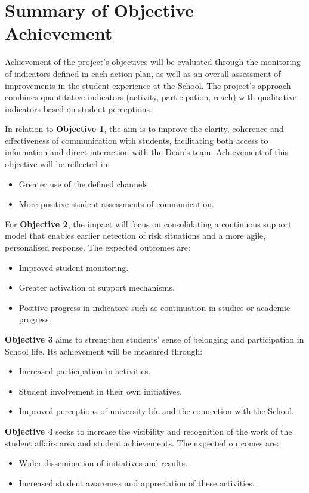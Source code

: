 \documentclass[11pt,a4paper]{scrreprt}
\begin{document}
\section{Summary of Objective Achievement}

\small
Achievement of the project's objectives will be evaluated through the monitoring of indicators defined in each action plan, as well as an overall assessment of improvements in the student experience at the School. The project's approach combines quantitative indicators (activity, participation, reach) with qualitative indicators based on student perceptions.

In relation to \textbf{Objective 1}, the aim is to improve the clarity, coherence and effectiveness of communication with students, facilitating both access to information and direct interaction with the Dean's team. Achievement of this objective will be reflected in:
\begin{itemize}[noitemsep,topsep=2pt]
\item Greater use of the defined channels.
\item More positive student assessments of communication.
\end{itemize}

For \textbf{Objective 2}, the impact will focus on consolidating a continuous support model that enables earlier detection of risk situations and a more agile, personalised response. The expected outcomes are:
\begin{itemize}[noitemsep,topsep=2pt]
\item Improved student monitoring.
\item Greater activation of support mechanisms.
\item Positive progress in indicators such as continuation in studies or academic progress.
\end{itemize}

\textbf{Objective 3} aims to strengthen students' sense of belonging and participation in School life. Its achievement will be measured through:
\begin{itemize}[noitemsep,topsep=2pt]
\item Increased participation in activities.
\item Student involvement in their own initiatives.
\item Improved perceptions of university life and the connection with the School.
\end{itemize}

\textbf{Objective 4} seeks to increase the visibility and recognition of the work of the student affairs area and student achievements. The expected outcomes are:
\begin{itemize}[noitemsep,topsep=2pt]
\item Wider dissemination of initiatives and results.
\item Increased student awareness and appreciation of these activities.
\end{itemize}
\end{document}
